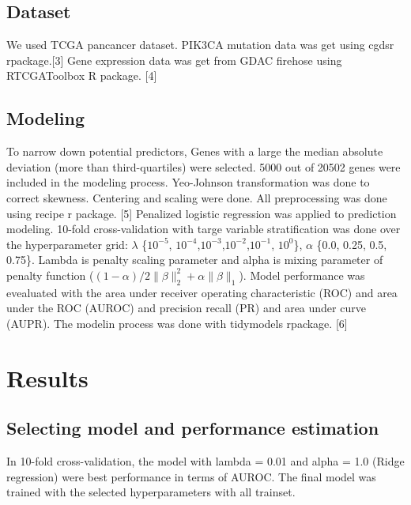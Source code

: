 \documentclass[10pt,letterpaper]{article}
\begin{document}
\hypertarget{dataset}{%
\subsection{Dataset}\label{dataset}}

We used TCGA pancancer dataset. PIK3CA mutation data was get using cgdsr
rpackage.{[}3{]} Gene expression data was get from GDAC firehose using
RTCGAToolbox R package. {[}4{]}

\hypertarget{modeling}{%
\subsection{Modeling}\label{modeling}}

To narrow down potential predictors, Genes with a large the median
absolute deviation (more than third-quartiles) were selected. 5000 out
of 20502 genes were included in the modeling process. Yeo-Johnson
transformation was done to correct skewness. Centering and scaling were
done. All preprocessing was done using recipe r package. {[}5{]}
Penalized logistic regression was applied to prediction modeling.
10-fold cross-validation with targe variable stratification was done
over the hyperparameter grid: \(\lambda\) \{\(10^{-5}\),
\(10^{-4}\),\(10^{-3}\),\(10^{-2}\),\(10^{-1}\), \(10^{0}\)\},
\(\alpha\) \{0.0, 0.25, 0.5, 0.75\}. Lambda is penalty scaling parameter
and alpha is mixing parameter of penalty function
(\((1-\alpha)/2 \lVert\beta\rVert_2^2+\alpha\lVert \beta \rVert_1\)).
Model performance was evealuated with the area under receiver operating
characteristic (ROC) and area under the ROC (AUROC) and precision recall
(PR) and area under curve (AUPR). The modelin process was done with
tidymodels rpackage. {[}6{]}

\hypertarget{results}{%
\section{Results}\label{results}}

\hypertarget{selecting-model-and-performance-estimation}{%
\subsection{Selecting model and performance
estimation}\label{selecting-model-and-performance-estimation}}

In 10-fold cross-validation, the model with lambda = 0.01 and alpha =
1.0 (Ridge regression) were best performance in terms of AUROC. The
final model was trained with the selected hyperparameters with all
trainset.
\end{document}
